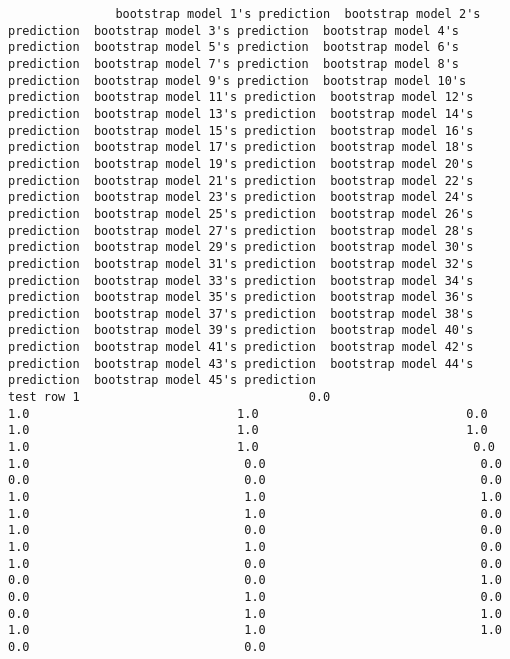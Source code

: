 \documentclass[11pt]{article}
\begin{document}
    
    
    \begin{verbatim}
               bootstrap model 1's prediction  bootstrap model 2's prediction  bootstrap model 3's prediction  bootstrap model 4's prediction  bootstrap model 5's prediction  bootstrap model 6's prediction  bootstrap model 7's prediction  bootstrap model 8's prediction  bootstrap model 9's prediction  bootstrap model 10's prediction  bootstrap model 11's prediction  bootstrap model 12's prediction  bootstrap model 13's prediction  bootstrap model 14's prediction  bootstrap model 15's prediction  bootstrap model 16's prediction  bootstrap model 17's prediction  bootstrap model 18's prediction  bootstrap model 19's prediction  bootstrap model 20's prediction  bootstrap model 21's prediction  bootstrap model 22's prediction  bootstrap model 23's prediction  bootstrap model 24's prediction  bootstrap model 25's prediction  bootstrap model 26's prediction  bootstrap model 27's prediction  bootstrap model 28's prediction  bootstrap model 29's prediction  bootstrap model 30's prediction  bootstrap model 31's prediction  bootstrap model 32's prediction  bootstrap model 33's prediction  bootstrap model 34's prediction  bootstrap model 35's prediction  bootstrap model 36's prediction  bootstrap model 37's prediction  bootstrap model 38's prediction  bootstrap model 39's prediction  bootstrap model 40's prediction  bootstrap model 41's prediction  bootstrap model 42's prediction  bootstrap model 43's prediction  bootstrap model 44's prediction  bootstrap model 45's prediction
test row 1                                0.0                             1.0                             1.0                             0.0                             1.0                             1.0                             1.0                             1.0                             1.0                              0.0                              1.0                              0.0                              0.0                              0.0                              0.0                              0.0                              1.0                              1.0                              1.0                              1.0                              1.0                              0.0                              1.0                              0.0                              0.0                              1.0                              1.0                              0.0                              1.0                              0.0                              0.0                              0.0                              0.0                              1.0                              0.0                              1.0                              0.0                              0.0                              1.0                              1.0                              1.0                              1.0                              1.0                              0.0                              0.0

\end{verbatim}
\end{document}
